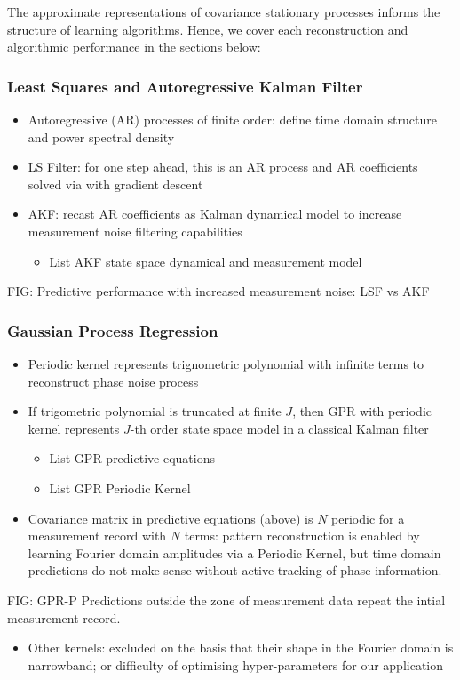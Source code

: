 The approximate representations of covariance stationary processes informs the structure of learning algorithms. Hence, we cover each reconstruction and algorithmic performance in the sections below:

\subsubsection{Least Squares and Autoregressive Kalman Filter}

\begin{itemize}
\item Autoregressive (AR) processes of finite order: define time domain structure and power spectral density
\item LS Filter: for one step ahead, this is an AR process and AR coefficients solved via with gradient descent
\item AKF: recast AR coefficients as Kalman dynamical model to increase measurement noise filtering capabilities 
\begin{itemize}
\item List AKF state space dynamical and measurement model 
\end{itemize}
\end{itemize}

FIG: Predictive performance with increased measurement noise: LSF vs AKF

\subsubsection{Gaussian Process Regression}
\begin{itemize}
\item Periodic kernel represents trignometric polynomial with infinite terms to reconstruct phase noise process
\item If trigometric polynomial is truncated at finite $J$, then GPR with periodic kernel represents $J$-th order state space model in a classical Kalman filter
\begin{itemize}
\item List GPR predictive equations
\item List GPR Periodic Kernel
\end{itemize}
\item Covariance matrix in predictive equations (above) is $N$ periodic for a  measurement record with $N$ terms: pattern reconstruction is enabled by learning Fourier domain amplitudes via a Periodic Kernel, but time domain predictions do not make sense without active tracking of phase information.
\end{itemize}
FIG: GPR-P Predictions outside the zone of measurement data repeat the intial measurement record.
\begin{itemize}
\item Other kernels: excluded on the basis that their shape in the Fourier domain is narrowband; or difficulty of optimising hyper-parameters for our application 
\end{itemize}
